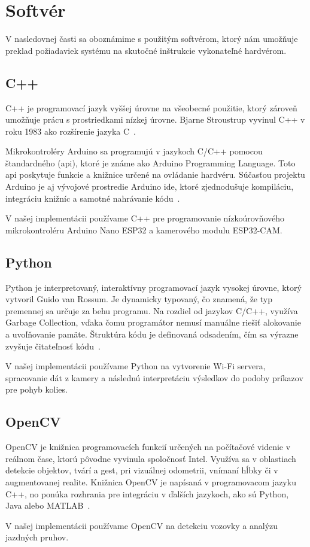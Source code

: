 \section{Softvér}\label{sec:Softver}
V nasledovnej časti sa oboznámime s použitým softvérom, ktorý nám umožňuje preklad požiadaviek systému na skutočné inštrukcie vykonateľné hardvérom.
\subsection{C++}
C++ je programovací jazyk vyššej úrovne na všeobecné použitie, ktorý zároveň umožňuje prácu s prostriedkami nízkej úrovne. Bjarne Stroustrup vyvinul C++ v roku 1983 ako rozšírenie jazyka C~\cite{stroustrupcpp}.\par
Mikrokontroléry Arduino sa programujú v jazykoch C/C++ pomocou štandardného  (\acrshort{api}), ktoré je známe ako Arduino Programming Language. Toto \acrshort{api} poskytuje funkcie a knižnice určené na ovládanie hardvéru. Súčasťou projektu Arduino je aj vývojové prostredie Arduino \acrshort{ide}, ktoré zjednodušuje kompiláciu, integráciu knižníc a samotné nahrávanie kódu~\cite{arduino}.\par
V našej implementácii používame C++ pre programovanie nízkoúrovňového mikrokontroléru Arduino Nano ESP32 a kamerového modulu ESP32-CAM.
\subsection{Python}
Python je interpretovaný, interaktívny programovací jazyk vysokej úrovne, ktorý vytvoril Guido van Rossum. Je dynamicky typovaný, čo znamená, že typ premennej sa určuje za behu programu. Na rozdiel od jazykov C/C++, využíva Garbage Collection, vďaka čomu programátor nemusí manuálne riešiť alokovanie a uvoľňovanie pamäte. Štruktúra kódu je definovaná odsadením, čím sa výrazne zvyšuje čitateľnosť kódu~\cite{kuhlmanpython}.\par
V našej implementácii používame Python na vytvorenie Wi-Fi servera, spracovanie dát z kamery a následnú interpretáciu výsledkov do podoby príkazov pre pohyb kolies.
\subsection{OpenCV}
OpenCV je knižnica programovacích funkcií určených na počítačové videnie v reálnom čase, ktorú pôvodne vyvinula spoločnosť Intel. Využíva sa v oblastiach detekcie objektov, tvárí a gest, pri vizuálnej odometrii, vnímaní hĺbky či v augmentovanej realite. Knižnica OpenCV je napísaná v programovacom jazyku C++, no ponúka rozhrania pre integráciu v ďalších jazykoch, ako sú Python, Java alebo MATLAB~\cite{acm2012}\cite{opencv2025}.\par
V našej implementácii používame OpenCV na detekciu vozovky a analýzu jazdných pruhov.
